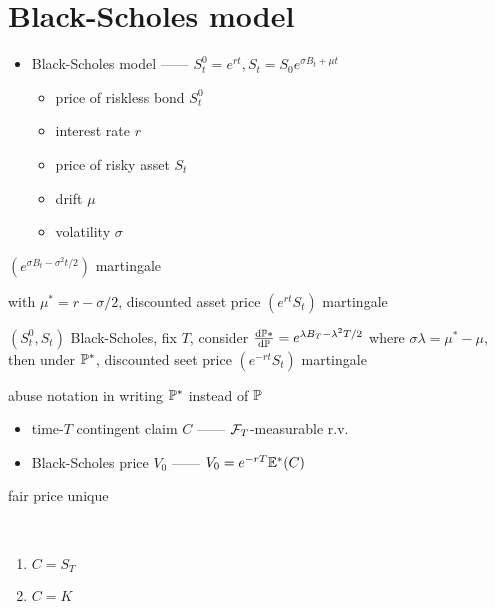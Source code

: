 \section{Black-Scholes model}\label{sec:black-scholes-model}

\begin{itemize}
    \item Black-Scholes model ------ $S_t^0 = e^{rt}, S_t = S_0 e^{\sigma B_t + \mu t}$
    \begin{itemize}
        \item price of riskless bond $S_t^0$
        \item interest rate $r$
        \item price of risky asset $S_t$
        \item drift $\mu$
        \item volatility $\sigma$
    \end{itemize}
\end{itemize}

\begin{fact}
    $(e^{\sigma B_t - \sigma^2 t/2})$ martingale
\end{fact}

\begin{fact}
    with $\mu^* = r - \sigma/2$, discounted asset price $(e^{rt}S_t)$ martingale
\end{fact}

\begin{prop}
    $(S_t^0, S_t)$ Black-Scholes, fix $T$, consider $\dv{\mathbb{P}*}{\mathbb{P}} = e^{\lambda B_T - \lambda^{2}T/2}$ where $\sigma \lambda = \mu^* - \mu$, then
    under $\mathbb{P}^*$, discounted seet price $(e^{-rt}S_t)$ martingale
\end{prop}

\begin{fact}
    abuse notation in writing $\mathbb{P}^*$ instead of $\mathbb{P}$
\end{fact}

\begin{itemize}
    \item time-$T$ contingent claim $C$ ------ $\mathcal{F}_T$-measurable r.v.
    \item Black-Scholes price $V_0$ ------ $V_0 = e^{-rT}\mathbb{E}^*(C)$
\end{itemize}

\begin{fact}
    fair price unique
\end{fact}

\begin{example}\,
    \begin{enumerate}
        \item $C = S_T$
        \item $C = K$
    \end{enumerate}
\end{example}


